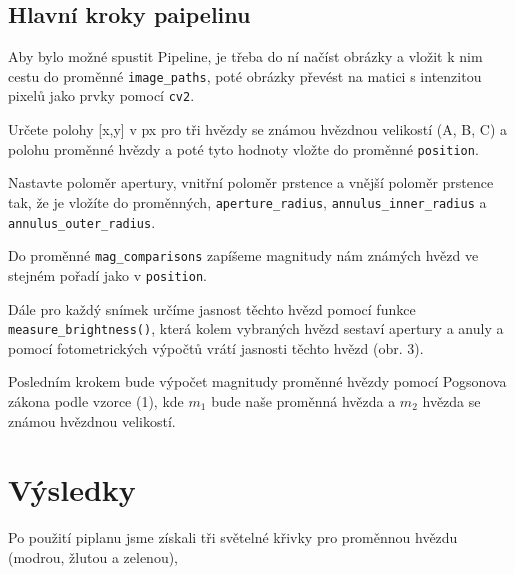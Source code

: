 \documentclass[a4paper,11pt]{article}
\begin{document}
\begin{minipage}[t]{0.5\textwidth}
            \subsection{Hlavní kroky paipelinu}
                \par Aby bylo možné spustit Pipeline, je třeba do ní načíst obrázky a vložit k nim cestu do proměnné \texttt{image\_paths}, poté obrázky převést na matici s intenzitou pixelů jako prvky pomocí \texttt{cv2}. 
                \par Určete polohy [x,y] v px pro tři hvězdy se známou hvězdnou velikostí (A, B, C) a polohu proměnné hvězdy a poté tyto hodnoty vložte do proměnné \texttt{position}.
                \par Nastavte poloměr apertury, vnitřní poloměr prstence a vnější poloměr prstence tak, že je vložíte do proměnných, \texttt{aperture\_radius}, \texttt{annulus\_inner\_radius} a \texttt{annulus\_outer\_radius}. 
                \par Do proměnné \texttt{mag\_comparisons} zapíšeme magnitudy nám známých hvězd ve stejném pořadí jako v \texttt{position}. 
                \par Dále pro každý snímek určíme jasnost těchto hvězd pomocí funkce \texttt{measure\_brightness()}, která kolem vybraných hvězd sestaví apertury a anuly a pomocí fotometrických výpočtů vrátí jasnosti těchto hvězd (obr. 3). 
                \par Posledním krokem bude výpočet magnitudy proměnné hvězdy pomocí Pogsonova zákona podle vzorce (1), kde $m_1$ bude naše proměnná hvězda a $m_2$ hvězda se známou hvězdnou velikostí. 
        \section{Výsledky}
                Po použití piplanu jsme získali tři světelné křivky pro proměnnou hvězdu (modrou, žlutou a zelenou),
    \end{minipage}
    \hspace{10pt}
\end{document}
